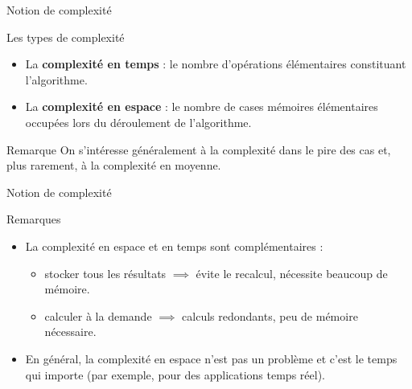 \begin{frame}{Notion de complexité}
\begin{block}{Les types de complexité}
  \begin{itemize}
    \item La \textbf{complexité en temps} : le nombre d'opérations élémentaires constituant l'algorithme.
    \item La \textbf{complexité en espace} : le nombre de cases mémoires élémentaires occupées lors du déroulement de l'algorithme.
  \end{itemize}
\end{block}

\begin{alertblock}{Remarque}
On s'intéresse généralement à la complexité dans le pire des cas et, plus rarement, à la complexité en moyenne.
\end{alertblock}
\end{frame}

\begin{frame}{Notion de complexité}
\begin{exampleblock}{Remarques}
\begin{itemize}
\item La complexité en espace et en temps sont complémentaires :
  \begin{itemize}
  \item stocker tous les résultats $\implies$ évite le recalcul, nécessite beaucoup de mémoire.
  \item calculer à la demande $\implies$ calculs redondants, peu de mémoire nécessaire.
  \end{itemize}
\item En général, la complexité en espace n'est pas un problème et c'est le temps qui importe (par exemple, pour des applications temps réel).
\end{itemize}
\end{exampleblock}
\end{frame}



